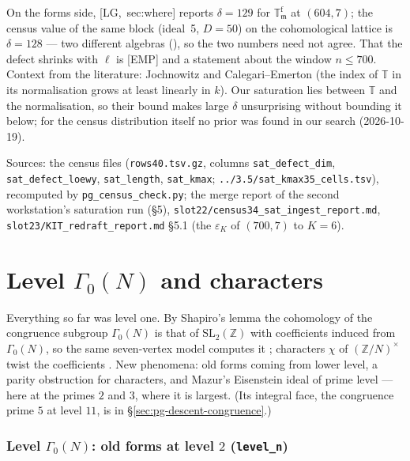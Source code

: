 \documentclass[11pt]{article}
\newcommand{\Z}{\mathbb{Z}}
\newcommand{\T}{\mathbb{T}}
\newcommand{\m}{\mathfrak{m}}
\newcommand{\SL}{\mathrm{SL}}
\newcommand{\Ga}{\Gamma}
\newcommand{\code}[1]{\texttt{#1}}
\newcommand{\file}[1]{\texttt{#1}}
\newcommand{\pfile}[1]{\nolinkurl{#1}}
\newcommand{\EMP}{\textsf{\small[EMP]}}
\begin{document}
On the forms side, [LG,~sec:where] reports $\delta=129$ for $\T^{\mathrm f}_\m$ at $(604,7)$; the census value of the same block (ideal~5,
$D=50$) on the cohomological lattice is $\delta=128$ --- two different algebras ({}), so the two numbers need not
agree. That the defect shrinks with $\ell$ is \EMP{} and a statement about the window $n\le700$. Context from the literature: Jochnowitz
\cite{jochnowitz} and Calegari--Emerton \cite[Thm.~2.1]{ph_ce_largeindex} (the index of $\T$ in its normalisation grows at least linearly in
$k$). Our saturation lies between $\T$ and the normalisation, so their bound makes large $\delta$ unsurprising without bounding it below; for the
census distribution itself no prior was found in our search (2026-10-19).

\noindent Sources: the census files (\pfile{rows40.tsv.gz}, columns \code{sat\_defect\_dim}, \code{sat\_defect\_loewy}, \code{sat\_length},
\code{sat\_kmax}; \pfile{../3.5/sat_kmax35_cells.tsv}), recomputed by \file{pg\_census\_check.py};
the merge report of the second workstation's saturation run (\S5), \pfile{slot22/census34_sat_ingest_report.md},
\pfile{slot23/KIT_redraft_report.md} \S5.1 (the $\varepsilon_K$ of $(700,7)$ to $K=6$).

\part{Level \texorpdfstring{$\Ga_0(N)$}{Gamma0(N)} and characters}\label{part:pg-level}

Everything so far was level one. By Shapiro's lemma the cohomology of the congruence subgroup $\Ga_0(N)$ is that of $\SL_2(\Z)$ with
coefficients induced from $\Ga_0(N)$, so the same seven-vertex model computes it {}; characters $\chi$ of
$(\Z/N)^{\times}$ twist the coefficients {}. New phenomena: old forms coming from lower level, a parity
obstruction for characters, and Mazur's Eisenstein ideal of prime level --- here at the primes $2$ and $3$, where it is largest. (Its
integral face, the congruence prime $5$ at level $11$, is in \S\ref{sec:pg-descent-congruence}.)

\section{Level $\Ga_0(N)$: old forms at level $2$ (\texttt{level\_n})}\label{sec:pg-leveln}
\end{document}
